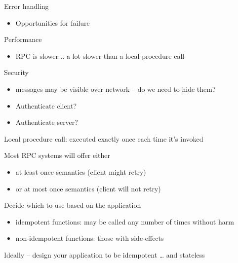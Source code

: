 \begin{slide}
	
	
	Error handling
	\begin{itemize}
		\item Opportunities for failure
	\end{itemize}
	\bigskip
	
	Performance
	\begin{itemize}
		\item RPC is slower .. a lot slower than a local procedure call
	\end{itemize}
	\bigskip
	
	Security
	\begin{itemize}
		\item messages may be visible over network – do we need to hide them?
		\item Authenticate client?
		\item Authenticate server?
	\end{itemize}
	
\end{slide}

\begin{slide}

	
	Local procedure call: executed exactly once each time it's invoked
	\bigskip
	
	Most RPC systems will offer either
	\begin{itemize}
		\item at least once semantics (client might retry)
		\item or at most once semantics (client will not retry)
	\end{itemize}
	\bigskip
	
	Decide which to use based on the application
	\begin{itemize}
		\item idempotent functions: may be called any number of times without harm
		\item non-idempotent functions: those with side-effects
	\end{itemize}
	\bigskip
	
	Ideally – design your application to be idempotent … and stateless
	
\end{slide}


